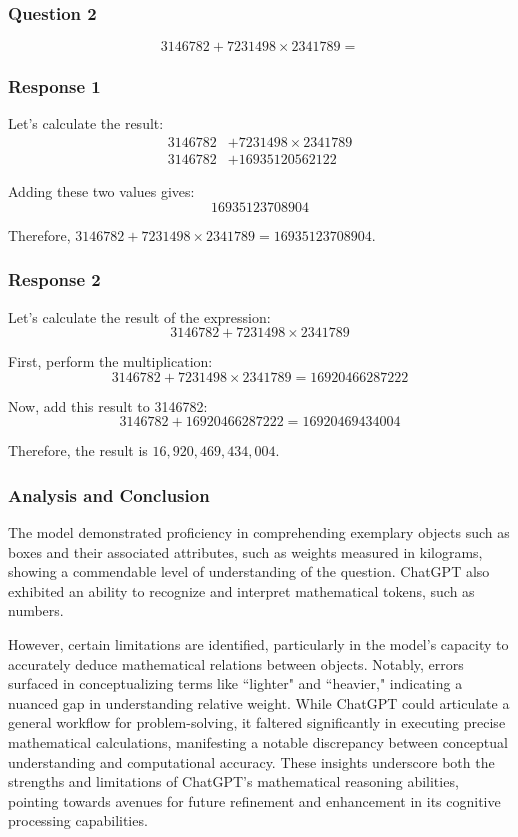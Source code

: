 \documentclass[12pt, a4paper]{article}
\begin{document}
\subsubsection*{Question 2}
$$3146782 + 7231498 \times 2341789 =$$

\subsubsection*{Response 1}
Let's calculate the result:
\begin{align*}
    3146782 &+ 7231498 \times 2341789 \\
    3146782 &+ 16935120562122
\end{align*}

Adding these two values gives:
$$16935123708904$$

Therefore, $3146782 + 7231498 \times 2341789 = 16935123708904$.

\subsubsection*{Response 2}
Let's calculate the result of the expression:
$$3146782 + 7231498 \times 2341789$$

First, perform the multiplication:
$$3146782 + 7231498 × 2341789 = 16920466287222$$

Now, add this result to 3146782:
$$3146782 + 16920466287222 = 16920469434004$$

Therefore, the result is $16,920,469,434,004$.

\subsubsection*{Analysis and Conclusion}
The model demonstrated proficiency in comprehending exemplary objects such as boxes and their associated attributes, such as weights measured in kilograms, showing a commendable level of understanding of the question. ChatGPT also exhibited an ability to recognize and interpret mathematical tokens, such as numbers.

However, certain limitations are identified, particularly in the model's capacity to accurately deduce mathematical relations between objects. Notably, errors surfaced in conceptualizing terms like ``lighter" and ``heavier," indicating a nuanced gap in understanding relative weight. While ChatGPT could articulate a general workflow for problem-solving, it faltered significantly in executing precise mathematical calculations, manifesting a notable discrepancy between conceptual understanding and computational accuracy. These insights underscore both the strengths and limitations of ChatGPT's mathematical reasoning abilities, pointing towards avenues for future refinement and enhancement in its cognitive processing capabilities.
\end{document}
